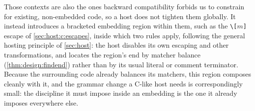 Those contexts are also the ones backward compatibility forbids us
to constrain for existing, non-embedded code,
so a host does not tighten them globally.
It instead introduces a bracketed embedding region within them,
such as the \verb|\[|$m$\verb|]| escape of \cref{sec:host:c:escapes},
inside which two rules apply,
following the general hosting principle of \cref{sec:host}:
the host disables its own escaping and other transformations,
and locates the region's end by matcher balance (\cref{thm:design:findend})
rather than by its usual literal or comment terminator.
Because the surrounding code already balances its matchers,
this region composes cleanly with it,
and the grammar change a C-like host needs is correspondingly small:
the discipline it must impose inside an embedding
is the one it already imposes everywhere else.